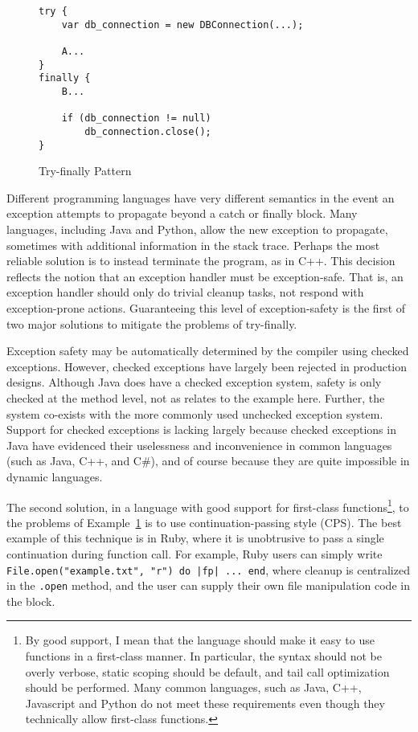 \documentclass[11pt]{article}
\begin{document}
\begin{figure}[H]
\caption{Try-finally Pattern}
\label{tryPattern}
\begin{verbatim}
try {  
    var db_connection = new DBConnection(...);

    A...
}
finally {
    B...

    if (db_connection != null)
        db_connection.close();
}
\end{verbatim}
\end{figure}

Different programming languages have very different semantics in the event an exception attempts to propagate beyond a catch or finally block.
Many languages, including Java and Python, allow the new exception to propagate, sometimes with additional information in the stack trace.
Perhaps the most reliable solution is to instead terminate the program, as in C++.\cite{evolutionCplusplus}
This decision reflects the notion that an exception handler must be exception-safe.
That is, an exception handler should only do trivial cleanup tasks, not respond with exception-prone actions.
Guaranteeing this level of exception-safety is the first of two major solutions to mitigate the problems of try-finally.

Exception safety may be automatically determined by the compiler using checked exceptions.
However, checked exceptions have largely been rejected in production designs.
Although Java does have a checked exception system, safety is only checked at the method level, not as relates to the example here.
Further, the system co-exists with the more commonly used unchecked exception system.
Support for checked exceptions is lacking largely because checked exceptions in Java have evidenced their uselessness and inconvenience in common languages (such as Java, C++, and C\#), and of course because they are quite impossible in dynamic languages.

The second solution, in a language with good support for first-class functions\footnote{By good support, I mean that the language should make it easy to use functions in a first-class manner. In particular, the syntax should not be overly verbose, static scoping should be default, and tail call optimization should be performed. Many common languages, such as Java, C++, Javascript and Python do not meet these requirements even though they technically allow first-class functions.}, to the problems of Example~\ref{tryPattern} is to use continuation-passing style (CPS).
The best example of this technique is in Ruby, where it is unobtrusive to pass a single continuation during function call.
For example, Ruby users can simply write \texttt{File.open("example.txt", "r") do |fp| ... end}, where cleanup is centralized in the \texttt{.open} method, and the user can supply their own file manipulation code in the block.\cite{programmingRuby}
\end{document}

